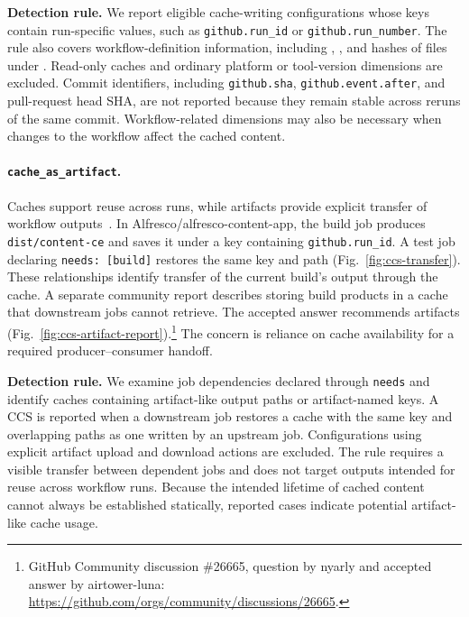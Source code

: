 \documentclass[smallextended]{svjour3}
\begin{document}


\textbf{Detection rule.}
We report eligible cache-writing configurations whose keys contain run-specific values, such as \texttt{github.run\_id} or \texttt{github.run\_number}. The rule also covers workflow-definition information, including , , and hashes of files under . Read-only caches and ordinary platform or tool-version dimensions are excluded. Commit identifiers, including \texttt{github.sha}, \texttt{github.event.after}, and pull-request head SHA, are not reported because they remain stable across reruns of the same commit. Workflow-related dimensions may also be necessary when changes to the workflow affect the cached content.



\flushbottom
\paragraph{\texttt{cache\_as\_artifact}.}
Caches support reuse across runs, while artifacts provide explicit transfer of workflow outputs~\citep{gha_cache_concepts,gha_artifact_docs}. In Alfresco/alfresco-content-app, the build job produces \texttt{dist/content-ce} and saves it under a key containing \texttt{github.run\_id}. A test job declaring \texttt{needs: [build]} restores the same key and path (Fig.~\ref{fig:ccs-transfer}). These relationships identify transfer of the current build's output through the cache. A separate community report describes storing build products in a cache that downstream jobs cannot retrieve. The accepted answer recommends artifacts (Fig.~\ref{fig:ccs-artifact-report}).\footnote{GitHub Community discussion \#26665, question by nyarly and accepted answer by airtower-luna: \url{https://github.com/orgs/community/discussions/26665}.} The concern is reliance on cache availability for a required producer--consumer handoff.

\textbf{Detection rule.}
We examine job dependencies declared through \texttt{needs} and identify caches containing artifact-like output paths or artifact-named keys. A CCS is reported when a downstream job restores a cache with the same key and overlapping paths as one written by an upstream job. Configurations using explicit artifact upload and download actions are excluded. The rule requires a visible transfer between dependent jobs and does not target outputs intended for reuse across workflow runs. Because the intended lifetime of cached content cannot always be established statically, reported cases indicate potential artifact-like cache usage.
\end{document}
